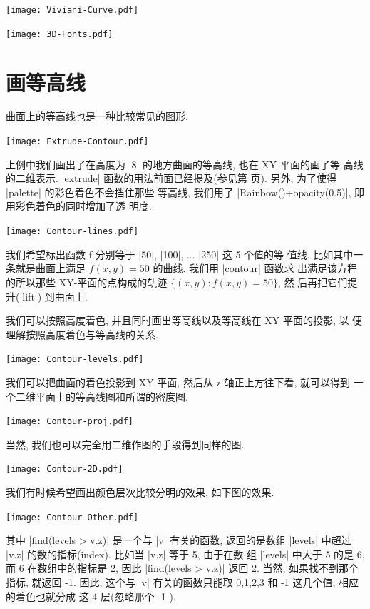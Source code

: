 \documentclass{ctexbook}
\begin{document}
\begin{center}\texttt{[image: Viviani-Curve.pdf]}\end{center}%


\begin{center}\texttt{[image: 3D-Fonts.pdf]}\end{center}%


\section{画等高线}
曲面上的等高线也是一种比较常见的图形.
\begin{center}\texttt{[image: Extrude-Contour.pdf]}\end{center}%

上例中我们画出了在高度为 |8| 的地方曲面的等高线, 也在 XY-平面的画了等
高线的二维表示. |extrude| 函数的用法前面已经提及(参见第
\pageref{extrude} 页). 另外, 为了使得 |palette| 的彩色着色不会挡住那些
等高线, 我们用了 |Rainbow()+opacity(0.5)|, 即用彩色着色的同时增加了透
明度.

\begin{center}\texttt{[image: Contour-lines.pdf]}\end{center}%

我们希望标出函数 f 分别等于 |50|, |100|, ... |250| 这 5 个值的等
值线. 比如其中一条就是曲面上满足 $f(x,y)=50$ 的曲线. 我们用 |contour| 函数求
出满足该方程的所以那些 XY-平面的点构成的轨迹 $\{(x,y):f(x,y)=50\}$, 然
后再把它们提升(|lift|) 到曲面上.

我们可以按照高度着色, 并且同时画出等高线以及等高线在 XY 平面的投影, 以
便理解按照高度着色与等高线的关系.
\begin{center}\texttt{[image: Contour-levels.pdf]}\end{center}%

我们可以把曲面的着色投影到 XY 平面, 然后从 z 轴正上方往下看, 就可以得到
一个二维平面上的等高线图和所谓的密度图.
\begin{center}\texttt{[image: Contour-proj.pdf]}\end{center}%

当然, 我们也可以完全用二维作图的手段得到同样的图.
\begin{center}\texttt{[image: Contour-2D.pdf]}\end{center}%

我们有时候希望画出颜色层次比较分明的效果, 如下图的效果.
\begin{center}\texttt{[image: Contour-Other.pdf]}\end{center}%

其中 |find(levels > v.z)| 是一个与 |v| 有关的函数, 返回的是数组
|levels| 中超过 |v.z| 的数的指标(index). 比如当 |v.z| 等于 5, 由于在数
组 |levels| 中大于 5 的是 6, 而 6 在数组中的指标是 2, 因此
|find(levels > v.z)| 返回 2. 当然, 如果找不到那个指标, 就返回 -1. 因此,
这个与 |v| 有关的函数只能取 0,1,2,3 和 -1 这几个值, 相应的着色也就分成
这 4 层(忽略那个 -1 ).
\end{document}
